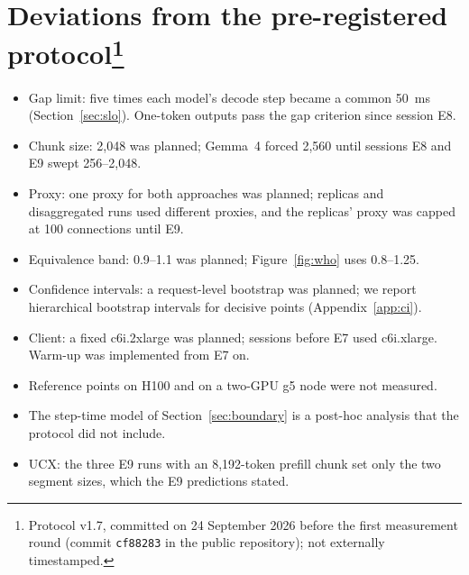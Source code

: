 \documentclass[11pt]{article}
\begin{document}
\section[Deviations from the pre-registered protocol]{Deviations from the pre-registered protocol\protect\footnote{Protocol v1.7, committed on 24 September 2026 before the first measurement round (commit \texttt{cf88283} in the public repository); not externally timestamped.}}\label{app:dev}
\begin{itemize}
  \item Gap limit: five times each model's decode step became a common 50~ms (Section~\ref{sec:slo}). One-token outputs pass the gap criterion since session E8.
  \item Chunk size: 2,048 was planned; Gemma~4 forced 2,560 until sessions E8 and E9 swept 256--2,048.
  \item Proxy: one proxy for both approaches was planned; replicas and disaggregated runs used different proxies, and the replicas' proxy was capped at 100 connections until E9.
  \item Equivalence band: 0.9--1.1 was planned; Figure~\ref{fig:who} uses 0.8--1.25.
  \item Confidence intervals: a request-level bootstrap was planned; we report hierarchical bootstrap intervals for decisive points (Appendix~\ref{app:ci}).
  \item Client: a fixed c6i.2xlarge was planned; sessions before E7 used c6i.xlarge. Warm-up was implemented from E7 on.
  \item Reference points on H100 and on a two-GPU g5 node were not measured.
  \item The step-time model of Section~\ref{sec:boundary} is a post-hoc analysis that the protocol did not include.
  \item UCX: the three E9 runs with an 8,192-token prefill chunk set only the two segment sizes, which the E9 predictions stated.
\end{itemize}
\end{document}
